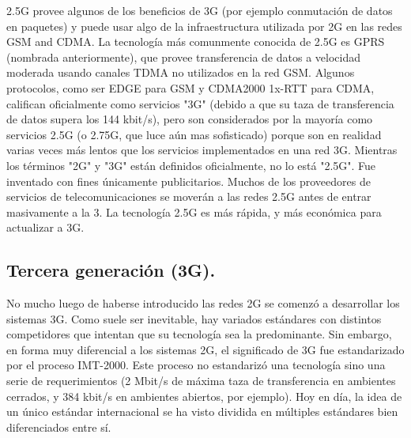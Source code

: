 \documentclass[]{article}
\begin{document}
2.5G provee algunos de los beneficios de 3G (por ejemplo conmutación de datos en
paquetes) y puede usar algo de la infraestructura utilizada por 2G en las redes
GSM and CDMA. La tecnología más comunmente conocida de 2.5G es GPRS
(nombrada anteriormente), que provee transferencia de datos a velocidad
moderada usando canales TDMA no utilizados en la red GSM. Algunos
protocolos, como ser EDGE para GSM y CDMA2000 1x-RTT para CDMA, califican
oficialmente como servicios "3G" (debido a que su taza de transferencia de datos
supera los 144 kbit/s), pero son considerados por la mayoría como servicios 2.5G
(o 2.75G, que luce aún mas sofisticado) porque son en realidad varias veces más
lentos que los servicios implementados en una red 3G.
Mientras los términos "2G" y "3G" están definidos oficialmente, no lo está "2.5G".
Fue inventado con fines únicamente publicitarios.
Muchos de los proveedores de servicios de telecomunicaciones se moverán a las
redes 2.5G antes de entrar masivamente a la 3. La tecnología 2.5G es más rápida, y
más económica para actualizar a 3G.\\

\subsection{Tercera generación (3G).}

No mucho luego de haberse introducido las redes 2G se comenzó a desarrollar los
sistemas 3G. Como suele ser inevitable, hay variados estándares con distintos
competidores que intentan que su tecnología sea la predominante. Sin embargo, en
forma muy diferencial a los sistemas 2G, el significado de 3G fue estandarizado
por el proceso IMT-2000. Este proceso no estandarizó una tecnología sino una serie
de requerimientos (2 Mbit/s de máxima taza de transferencia en ambientes
cerrados, y 384 kbit/s en ambientes abiertos, por ejemplo). Hoy en día, la idea de
un único estándar internacional se ha visto dividida en múltiples estándares bien
diferenciados entre sí.\\
\end{document}
